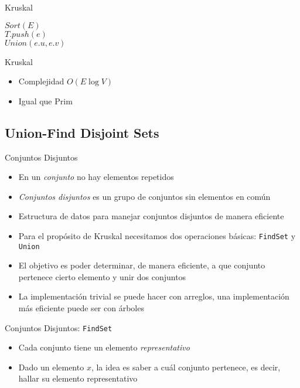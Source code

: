 \documentclass[]{beamer}
\begin{document}
\begin{frame}{Kruskal}
  \begin{algorithm}[H]
    {$Sort(E)$} \\
    {
      {
        {$ T.push(e)$} \\
        {$ Union(e.u, e.v)$ }
      }
    }
  \end{algorithm}
\end{frame}

\begin{frame}{Kruskal}
  \begin{itemize}
    \item Complejidad $O(E \log V)$
      \pause
    \item Igual que Prim
  \end{itemize}
\end{frame}

\subsection{Union-Find Disjoint Sets}
\begin{frame}{Conjuntos Disjuntos}
  \begin{itemize}
    \item En un \textit{conjunto} no hay elementos repetidos
      \pause
    \item \textit{Conjuntos disjuntos} es un grupo de conjuntos sin elementos en com\'un
      \pause
    \item Estructura de datos para manejar conjuntos disjuntos de manera eficiente
      \pause
    \item Para el prop\'osito de Kruskal necesitamos dos operaciones b\'asicas: \texttt{FindSet} y \texttt{Union}
      \pause
    \item El objetivo es poder determinar, de manera eficiente, a que conjunto pertenece cierto elemento y unir dos conjuntos
      \pause
    \item La implementaci\'on trivial se puede hacer con arreglos, una implementaci\'on m\'as eficiente puede ser con \'arboles
  \end{itemize}
\end{frame}

\begin{frame}{Conjuntos Disjuntos: \texttt{FindSet}}
  \begin{itemize}
    \item Cada conjunto tiene un elemento \textit{representativo}
      \pause
    \item Dado un elemento $x$, la idea es saber a cu\'al conjunto pertenece, es decir, hallar su elemento representativo
  \end{itemize}
\end{frame}
\end{document}

